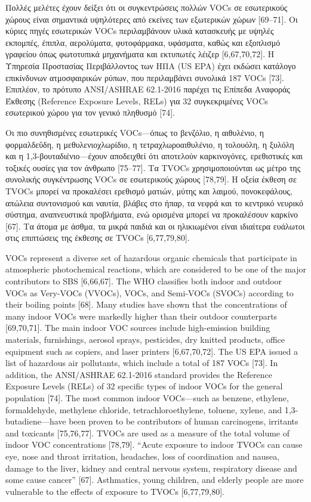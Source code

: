 Πολλές μελέτες έχουν δείξει ότι οι συγκεντρώσεις πολλών VOCs σε εσωτερικούς χώρους είναι σημαντικά υψηλότερες από εκείνες των εξωτερικών χώρων [69–71]. Οι κύριες πηγές εσωτερικών VOCs περιλαμβάνουν υλικά κατασκευής με υψηλές εκπομπές, έπιπλα, αερολύματα, φυτοφάρμακα, υφάσματα, καθώς και εξοπλισμό γραφείου όπως φωτοτυπικά μηχανήματα και εκτυπωτές λέιζερ [6,67,70,72]. Η Υπηρεσία Προστασίας Περιβάλλοντος των ΗΠΑ (US EPA) έχει εκδώσει κατάλογο επικίνδυνων ατμοσφαιρικών ρύπων, που περιλαμβάνει συνολικά 187 VOCs [73]. Επιπλέον, το πρότυπο ANSI/ASHRAE 62.1-2016 παρέχει τις Επίπεδα Αναφοράς Έκθεσης (Reference Exposure Levels, RELs) για 32 συγκεκριμένες VOCs εσωτερικού χώρου για τον γενικό πληθυσμό [74].

Οι πιο συνηθισμένες εσωτερικές VOCs—όπως το βενζόλιο, η αιθυλένιο, η φορμαλδεΰδη, η μεθυλενιοχλωρίδιο, η τετραχλωροαιθυλένιο, η τολουόλη, η ξυλόλη και η 1,3-βουταδιένιο—έχουν αποδειχθεί ότι αποτελούν καρκινογόνες, ερεθιστικές και τοξικές ουσίες για τον άνθρωπο [75–77]. Τα TVOCs χρησιμοποιούνται ως μέτρο της συνολικής συγκέντρωσης VOCs σε εσωτερικούς χώρους [78,79]. Η οξεία έκθεση σε TVOCs μπορεί να προκαλέσει ερεθισμό ματιών, μύτης και λαιμού, πονοκεφάλους, απώλεια συντονισμού και ναυτία, βλάβες στο ήπαρ, τα νεφρά και το κεντρικό νευρικό σύστημα, αναπνευστικά προβλήματα, ενώ ορισμένα μπορεί να προκαλέσουν καρκίνο [67]. Τα άτομα με άσθμα, τα μικρά παιδιά και οι ηλικιωμένοι είναι ιδιαίτερα ευάλωτοι στις επιπτώσεις της έκθεσης σε TVOCs [6,77,79,80].

VOCs represent a diverse set of hazardous organic chemicals that participate in atmospheric photochemical reactions, which are considered to be one of the major contributors to SBS [6,66,67]. The WHO classifies both indoor and outdoor VOCs as Very-VOCs (VVOCs), VOCs, and Semi-VOCs (SVOCs) according to their boiling points [68]. Many studies have shown that the concentrations of many indoor VOCs were markedly higher than their outdoor counterparts [69,70,71]. The main indoor VOC sources include high-emission building materials, furnishings, aerosol sprays, pesticides, dry knitted products, office equipment such as copiers, and laser printers [6,67,70,72]. The US EPA issued a list of hazardous air pollutants, which include a total of 187 VOCs [73]. In addition, the ANSI/ASHRAE 62.1-2016 standard provides the Reference Exposure Levels (RELs) of 32 specific types of indoor VOCs for the general population [74]. The most common indoor VOCs—such as benzene, ethylene, formaldehyde, methylene chloride, tetrachloroethylene, toluene, xylene, and 1,3-butadiene—have been proven to be contributors of human carcinogens, irritants and toxicants [75,76,77]. TVOCs are used as a measure of the total volume of indoor VOC concentrations [78,79]. “Acute exposure to indoor TVOCs can cause eye, nose and throat irritation, headaches, loss of coordination and nausea, damage to the liver, kidney and central nervous system, respiratory disease and some cause cancer” [67]. Asthmatics, young children, and elderly people are more vulnerable to the effects of exposure to TVOCs [6,77,79,80]. 

